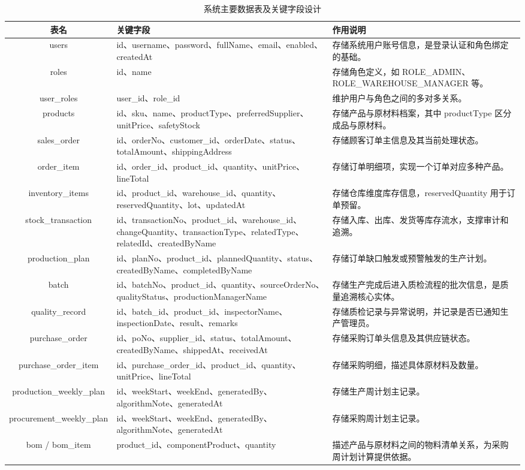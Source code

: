 \begin{table}[htbp]
\centering
\footnotesize
\caption{系统主要数据表及关键字段设计}
\label{tab:real-main-tables}
\begin{tabular}{|c|p{4.0cm}|p{6.8cm}|}
\hline
表名 & 关键字段 & 作用说明 \\\hline
users & id、username、password、fullName、email、enabled、createdAt & 存储系统用户账号信息，是登录认证和角色绑定的基础。 \\\hline
roles & id、name & 存储角色定义，如 ROLE\_ADMIN、ROLE\_WAREHOUSE\_MANAGER 等。 \\\hline
user\_roles & user\_id、role\_id & 维护用户与角色之间的多对多关系。 \\\hline
products & id、sku、name、productType、preferredSupplier、unitPrice、safetyStock & 存储产品与原材料档案，其中 productType 区分成品与原材料。 \\\hline
sales\_order & id、orderNo、customer\_id、orderDate、status、totalAmount、shippingAddress & 存储顾客订单主信息及其当前处理状态。 \\\hline
order\_item & id、order\_id、product\_id、quantity、unitPrice、lineTotal & 存储订单明细项，实现一个订单对应多种产品。 \\\hline
inventory\_items & id、product\_id、warehouse\_id、quantity、reservedQuantity、lot、updatedAt & 存储仓库维度库存信息，reservedQuantity 用于订单预留。 \\\hline
stock\_transaction & id、transactionNo、product\_id、warehouse\_id、changeQuantity、transactionType、relatedType、relatedId、createdByName & 存储入库、出库、发货等库存流水，支撑审计和追溯。 \\\hline
production\_plan & id、planNo、product\_id、plannedQuantity、status、createdByName、completedByName & 存储订单缺口触发或预警触发的生产计划。 \\\hline
batch & id、batchNo、product\_id、quantity、sourceOrderNo、qualityStatus、productionManagerName & 存储生产完成后进入质检流程的批次信息，是质量追溯核心实体。 \\\hline
quality\_record & id、batch\_id、product\_id、inspectorName、inspectionDate、result、remarks & 存储质检记录与异常说明，并记录是否已通知生产管理员。 \\\hline
purchase\_order & id、poNo、supplier\_id、status、totalAmount、createdByName、shippedAt、receivedAt & 存储采购订单头信息及其供应链状态。 \\\hline
purchase\_order\_item & id、purchase\_order\_id、product\_id、quantity、unitPrice、lineTotal & 存储采购明细，描述具体原材料及数量。 \\\hline
production\_weekly\_plan & id、weekStart、weekEnd、generatedBy、algorithmNote、generatedAt & 存储生产周计划主记录。 \\\hline
procurement\_weekly\_plan & id、weekStart、weekEnd、generatedBy、algorithmNote、generatedAt & 存储采购周计划主记录。 \\\hline
bom / bom\_item & product\_id、componentProduct、quantity & 描述产品与原材料之间的物料清单关系，为采购周计划计算提供依据。 \\\hline
\end{tabular}
\end{table}

